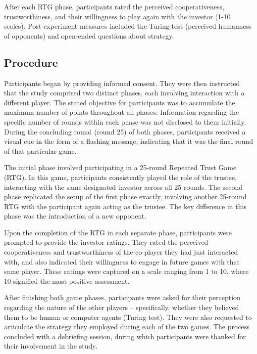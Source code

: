 \documentclass[
]{article}
\begin{document}
After each RTG phase, participants rated the perceived cooperativeness, trustworthiness, and their willingness to play again with the investor (1-10 scales).
Post-experiment measures included the Turing test (perceived humanness of opponents) and open-ended questions about strategy.

\subsection{Procedure}\label{procedure}

Participants began by providing informed consent.
They were then instructed that the study comprised two distinct phases, each involving interaction with a different player.
The stated objective for participants was to accumulate the maximum number of points throughout all phases.
Information regarding the specific number of rounds within each phase was not disclosed to them initially.
During the concluding round (round 25) of both phases, participants received a visual cue in the form of a flashing message, indicating that it was the final round of that particular game.

The initial phase involved participating in a 25-round Repeated Trust Game (RTG).
In this game, participants consistently played the role of the trustee, interacting with the same designated investor across all 25 rounds.
The second phase replicated the setup of the first phase exactly, involving another 25-round RTG with the participant again acting as the trustee.
The key difference in this phase was the introduction of a new opponent.

Upon the completion of the RTG in each separate phase, participants were prompted to provide the investor ratings.
They rated the perceived cooperativeness and trustworthiness of the co-player they had just interacted with, and also indicated their willingness to engage in future games with that same player.
These ratings were captured on a scale ranging from 1 to 10, where 10 signified the most positive assessment.

After finishing both game phases, participants were asked for their perception regarding the nature of the other players -- specifically, whether they believed them to be human or computer agents (Turing test).
They were also requested to articulate the strategy they employed during each of the two games.
The process concluded with a debriefing session, during which participants were thanked for their involvement in the study.
\end{document}
